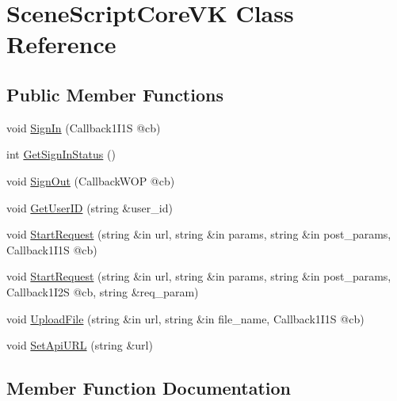\hypertarget{class_scene_script_core_v_k}{}\section{Scene\+Script\+Core\+VK Class Reference}
\label{class_scene_script_core_v_k}
\subsection*{Public Member Functions}
\begin{DoxyCompactItemize}
\item 
void \hyperlink{class_scene_script_core_v_k_a66d107d8cffdd7318a25b261f5441dee}{Sign\+In} (Callback1\+I1S @cb)
\item 
int \hyperlink{class_scene_script_core_v_k_a48e28f918c06fcef769c77b4ca3da03b}{Get\+Sign\+In\+Status} ()
\item 
void \hyperlink{class_scene_script_core_v_k_a07203664f6965847d0945c8406331147}{Sign\+Out} (Callback\+W\+OP @cb)
\item 
void \hyperlink{class_scene_script_core_v_k_a18135318a65d139230cf2d9ccb04143c}{Get\+User\+ID} (string \&user\+\_\+id)
\item 
void \hyperlink{class_scene_script_core_v_k_a4bc030a90e977b59b93896bfbcaa858b}{Start\+Request} (string \&in url, string \&in params, string \&in post\+\_\+params, Callback1\+I1S @cb)
\item 
void \hyperlink{class_scene_script_core_v_k_aa56d31e31240b7e214466b42993357fa}{Start\+Request} (string \&in url, string \&in params, string \&in post\+\_\+params, Callback1\+I2S @cb, string \&req\+\_\+param)
\item 
void \hyperlink{class_scene_script_core_v_k_a21d1e5eb863fe6c425c43c942ea5cadb}{Upload\+File} (string \&in url, string \&in file\+\_\+name, Callback1\+I1S @cb)
\item 
void \hyperlink{class_scene_script_core_v_k_a413ba619d82287bb28e21ab2ef0006a6}{Set\+Api\+U\+RL} (string \&url)
\end{DoxyCompactItemize}


\subsection{Member Function Documentation}
\hypertarget{class_scene_script_core_v_k_a48e28f918c06fcef769c77b4ca3da03b}{}\label{class_scene_script_core_v_k_a48e28f918c06fcef769c77b4ca3da03b} 
